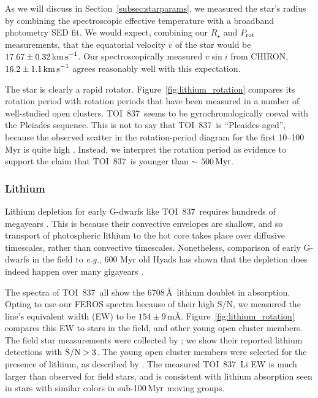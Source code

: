 \documentclass[12pt,twocolumn,tighten]{aastex63}
\newcommand{\tn}{TOI~837} %
\begin{document}
As we will discuss in Section~\ref{subsec:starparams}, we measured the
star's radius by combining the spectroscopic effective temperature
with a broadband photometry SED fit.  We would expect, combining our
$R_\star$ and $P_{\rm rot}$ measurements, that the equatorial velocity
$v$ of the star would be $17.67 \pm 0.32 \,{\rm km\,s}^{-1}$.  Our
spectroscopically measured $v\sin i$ from CHIRON, $16.2 \pm 1.1
\,{\rm km\,s}^{-1}$ agrees reasonably well with this expectation.

The star is clearly a rapid rotator.
Figure~\ref{fig:lithium_rotation} compares its rotation period with
rotation periods that have been measured in a number of well-studied
open clusters.  \tn\ seems to be gyrochronologically coeval with the
Pleiades sequence.  This is not to say that \tn\ is ``Pleaides-aged'',
because the observed scatter in the rotation-period diagram for the
first 10--100$\,$Myr is quite high \citep[see Figure~9
of][]{rebull_rotation_2020}.  Instead, we interpret the rotation
period as evidence to support the claim that \tn\ is younger than
$\sim$ $500\,{\rm Myr}$.


\subsubsection{Lithium}

Lithium depletion for early G-dwarfs like \tn\ requires hundreds of
megayears \citep{soderblom_ages_2014}. This is because their
convective envelopes are shallow, and so transport of photospheric
lithium to the hot core takes place over diffusive timescales, rather
than convective timescales.  Nonetheless, comparison of early G-dwarfs
in the field to {\it e.g.}, 600 Myr old Hyads has shown that the
depletion does indeed happen over many gigayears
\citep{berger_identifying_2018}.

The spectra of \tn\ all show the 6708$\,$\AA\ lithium doublet in
absorption. Opting to use our FEROS spectra because of their high S/N,
we measured the line's equivalent width (EW) to be $154 \pm 9 \,
$m\AA.  Figure~\ref{fig:lithium_rotation} compares this EW to stars in
the field, and other young open cluster members.  The field star
measurements were collected by \citet{berger_identifying_2018}; we
show their reported lithium detections with ${\rm S/N}>3$.  The young
open cluster members were selected for the presence of lithium, as
described by \citet{randich_gaiaeso_2018}.  The measured \tn\ Li EW is
much larger than observed for field stars, and is consistent with
lithium absorption seen in stars with similar colors in sub-100$\,{\rm
Myr}$ moving groups.
\end{document}
